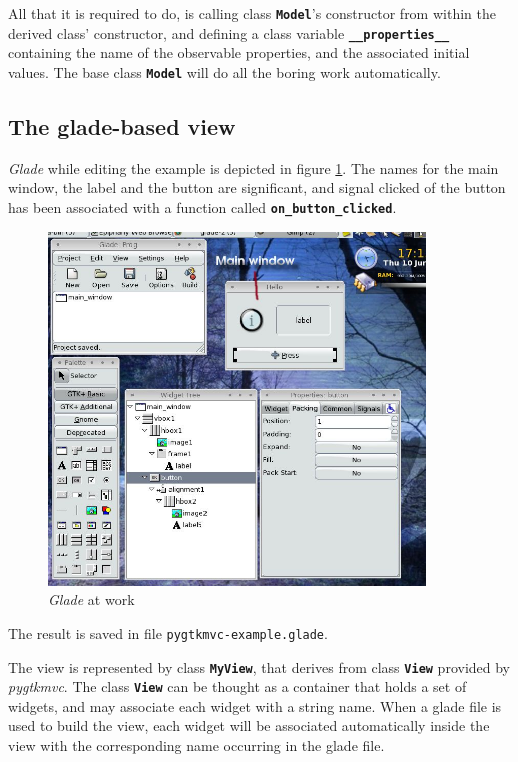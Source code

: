 \documentclass{article}
\newcommand{\kw}[1]{\emph{#1}\xspace}
\newcommand{\appl}[1]{\textsl{#1}\xspace}
\newcommand{\glade}{\appl{Glade}}
\newcommand{\pygtkmvc}{\kw{pygtkmvc}}
\newcommand{\file}[1]{\texttt{#1}\xspace}
\newcommand{\codename}[1]{\texttt{\bfseries \textcolor {codecolor}{#1}}\xspace}
\begin{document}
All that it is required to do, is calling class \codename{Model}'s
constructor from within the derived class' constructor, and defining a
class variable \codename{\_\_properties\_\_} containing the name of the
observable properties, and the associated initial values. The base
class \codename{Model} will do all the boring work automatically.



\subsection{The glade-based view}
\glade while editing the example is depicted in figure
\ref{fig:glade}. The names for the main window, the label and the
button are significant, and signal clicked of the button has been
associated with a function called \codename{on\_button\_clicked}.

\begin{figure}[htbp]
\begin{center}
\includegraphics[width=10cm]{eps/glade}
\caption{\label{fig:glade}\glade at work}
\end{center}
\end{figure}


The result is saved in file \file{pygtkmvc-example.glade}.

The view is represented by class \codename{MyView}, that derives from
class \codename{View} provided by \pygtkmvc. The class \codename{View}
can be thought as a container that holds a set of widgets, and may
associate each widget with a string name. When a glade file is used to
build the view, each widget will be associated automatically inside
the view with the corresponding name occurring in the glade file.
\end{document}
